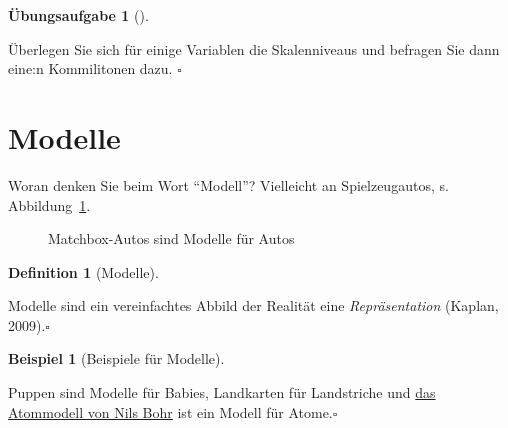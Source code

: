\documentclass[
  a4paper,
  DIV=11]{scrreprt}
\theoremstyle{definition}
\newtheorem{exercise}{Übungsaufgabe}[chapter]
\theoremstyle{definition}
\newtheorem{example}{Beispiel}[chapter]
\theoremstyle{definition}
\newtheorem{definition}{Definition}[chapter]
\theoremstyle{remark}
\begin{document}
\begin{exercise}[]\protect\hypertarget{exr-skalenniveaus}{}\label{exr-skalenniveaus}

Überlegen Sie sich für einige Variablen die Skalenniveaus und befragen
Sie dann eine:n Kommilitonen dazu. \(\square\)

\end{exercise}

\section{Modelle}\label{modelle}

Woran denken Sie beim Wort ``Modell''? Vielleicht an Spielzeugautos, s.
Abbildung~\ref{fig-matchbox}.

\begin{figure}


\caption{\label{fig-matchbox}Matchbox-Autos sind Modelle für Autos}

\end{figure}%

\begin{definition}[Modelle]\protect\hypertarget{def-modelle}{}\label{def-modelle}

Modelle sind ein vereinfachtes Abbild der Realität eine
\emph{Repräsentation} (Kaplan, 2009).\(\square\)

\end{definition}

\begin{example}[Beispiele für
Modelle]\protect\hypertarget{exm-Modelle}{}\label{exm-Modelle}

Puppen sind Modelle für Babies, Landkarten für Landstriche und
\href{https://de.wikipedia.org/wiki/Bohrsches_Atommodell}{das Atommodell
von Nils Bohr} ist ein Modell für Atome.\(\square\)

\end{example}
\end{document}
